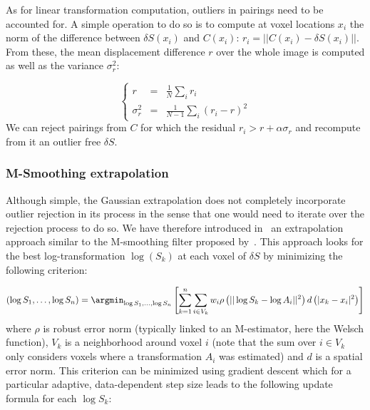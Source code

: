 As for linear transformation computation, outliers in pairings need to be accounted for. A simple operation to do so is to compute at voxel locations $x_i$ the norm of the difference between $\delta S(x_i)$ and $C(x_i)$: $r_i = || C(x_i) - \delta S(x_i) ||$. From these, the mean displacement difference $r$ over the whole image is computed as well as the variance $\sigma_r^2$:

\begin{equation}
\left\{
  \begin{array}{ccl}
	r &= & \frac{1}{N} \sum_i r_i \\
	\sigma_r^2 & = & \frac{1}{N-1} \sum_i (r_i - r)^2
	\end{array}
\right.
\end{equation}
We can reject pairings from $C$ for which the residual $r_i > r + \alpha \sigma_r$ and recompute from it an outlier free $\delta S$.


\subsubsection{M-Smoothing extrapolation} %
\label{ssub:m_smoothing_extrapolation}

Although simple, the Gaussian extrapolation does not completely incorporate outlier rejection in its process in the sense that one would need to iterate over the rejection process to do so. We have therefore introduced in~\cite{Commowick_Miccai_2012} an extrapolation approach similar to the M-smoothing filter proposed by~\cite{Mrazek_Chapter_2006}. This approach looks for the best log-transformation $\log(S_k)$ at each voxel of $\delta S$ by minimizing the following criterion:

\begin{equation}
	\left( \log S_1,\ldots,\log S_n \right) = \argmin_{\log S_1,\ldots,\log S_n} \left[ \sum_{k=1}^n \sum_{i \in V_k} w_i \rho\left( || \log S_k - \log A_i||^2 \right) d\left( |x_k - x_i|^2 \right) \right]
\end{equation}
where $\rho$ is robust error norm (typically linked to an M-estimator, here the Welsch function), $V_k$ is a neighborhood around voxel $i$ (note that the sum over $i \in V_k$ only considers voxels where a transformation $A_i$ was estimated) and $d$ is a spatial error norm. This criterion can be minimized using gradient descent which for a particular adaptive, data-dependent step size leads to the following update formula for each $\log S_k$:

